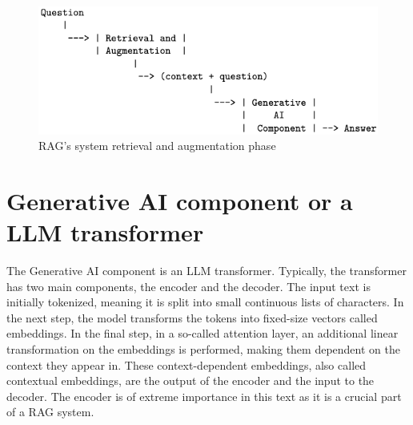 \documentclass{wseas}
\begin{document}
\begin{figure}[htbp]
  \centering
  \includegraphics[width=\linewidth]{resources/v1/retrievalAndAugmentation.png}
  \caption{RAG's system retrieval and augmentation phase}
  \label{fig:rag_system_figure}
\end{figure}





\section{Generative AI component or a LLM transformer}

The Generative AI component is an LLM transformer. Typically, the
transformer has two main components, the encoder and the decoder. The
input text is initially tokenized, meaning it is split into small
continuous lists of characters. In the next step, the model transforms
the tokens into fixed-size vectors called embeddings. In the final step,
in a so-called attention layer, an additional linear transformation on
the embeddings is performed, making them dependent on the context they
appear in. These context-dependent embeddings, also called contextual
embeddings, are the output of the encoder and the input to the decoder.
The encoder is of extreme importance in this text as it is a crucial
part of a RAG system.
\end{document}

